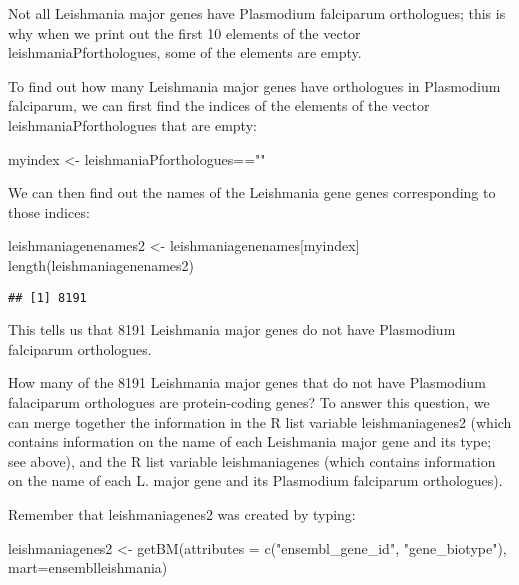 \documentclass[
]{book}
\newenvironment{Shaded}{\begin{snugshade}}{\end{snugshade}}
\newcommand{\AttributeTok}[1]{\textcolor[rgb]{0.77,0.63,0.00}{#1}}
\newcommand{\FunctionTok}[1]{\textcolor[rgb]{0.00,0.00,0.00}{#1}}
\newcommand{\NormalTok}[1]{#1}
\newcommand{\OtherTok}[1]{\textcolor[rgb]{0.56,0.35,0.01}{#1}}
\newcommand{\SpecialCharTok}[1]{\textcolor[rgb]{0.00,0.00,0.00}{#1}}
\newcommand{\StringTok}[1]{\textcolor[rgb]{0.31,0.60,0.02}{#1}}
\begin{document}
Not all Leishmania major genes have Plasmodium falciparum orthologues; this is why when we print out the first 10 elements of the vector leishmaniaPforthologues, some of the elements are empty.

To find out how many Leishmania major genes have orthologues in Plasmodium falciparum, we can first find the indices of the elements of the vector leishmaniaPforthologues that are empty:

\begin{Shaded}
\begin{Highlighting}[]
\NormalTok{myindex }\OtherTok{\textless{}{-}}\NormalTok{ leishmaniaPforthologues}\SpecialCharTok{==}\StringTok{""}
\end{Highlighting}
\end{Shaded}

We can then find out the names of the Leishmania gene genes corresponding to those indices:

\begin{Shaded}
\begin{Highlighting}[]
\NormalTok{leishmaniagenenames2 }\OtherTok{\textless{}{-}}\NormalTok{ leishmaniagenenames[myindex]}
\FunctionTok{length}\NormalTok{(leishmaniagenenames2)}
\end{Highlighting}
\end{Shaded}

\begin{verbatim}
## [1] 8191
\end{verbatim}

This tells us that 8191 Leishmania major genes do not have Plasmodium falciparum orthologues.

How many of the 8191 Leishmania major genes that do not have Plasmodium falaciparum orthologues are protein-coding genes? To answer this question, we can merge together the information in the R list variable leishmaniagenes2 (which contains information on the name of each Leishmania major gene and its type; see above), and the R list variable leishmaniagenes (which contains information on the name of each L. major gene and its Plasmodium falciparum orthologues).

Remember that leishmaniagenes2 was created by typing:

\begin{Shaded}
\begin{Highlighting}[]
\NormalTok{leishmaniagenes2 }\OtherTok{\textless{}{-}} \FunctionTok{getBM}\NormalTok{(}\AttributeTok{attributes =} \FunctionTok{c}\NormalTok{(}\StringTok{"ensembl\_gene\_id"}\NormalTok{, }\StringTok{"gene\_biotype"}\NormalTok{), }\AttributeTok{mart=}\NormalTok{ensemblleishmania)}
\end{Highlighting}
\end{Shaded}
\end{document}
